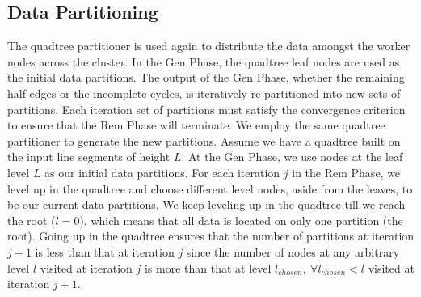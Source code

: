 
\subsection{Data Partitioning}\label{sec:partitioning_ddcel}

The quadtree partitioner is used again to distribute the data amongst the worker nodes across the cluster. In the Gen Phase, the quadtree leaf nodes are used as the initial data partitions.
The output of the Gen Phase, whether the remaining half-edges or the incomplete cycles, is iteratively re-partitioned into new sets of partitions.
Each iteration set of partitions must satisfy the convergence criterion to ensure that the Rem Phase will terminate.
We employ the same quadtree partitioner to generate the new partitions. 
Assume we have a quadtree built on the input line segments of height $L$. 
At the Gen Phase, we use nodes at the leaf level $L$ as our initial data partitions. For each iteration $j$ in the Rem Phase, we level up in the quadtree and choose different level nodes, aside from the leaves, to be our current data partitions.  
We keep leveling up in the quadtree till we reach the root ($l=0$), which means that all data is located on only one partition (the root).
Going up in the quadtree ensures that the number of partitions at iteration $j+1$ is less than that at iteration $j$ since the number of nodes at any arbitrary level $l$ visited at iteration $j$ is more than that at level $l_{chosen}, \ \forall l_{chosen} < l$ visited at iteration $j+1$.


